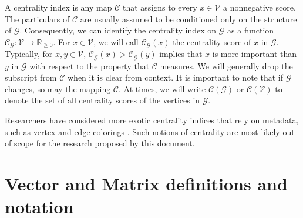 \documentclass{report}
\begin{document}
A centrality index is any map $\mathcal{C}$ that assigns to every $x \in \mathcal{V}$ a nonnegative score.
The particulars of $\mathcal{C}$ are usually assumed to be conditioned only on the structure of $\mathcal{G}$.
Consequently, we can identify the centrality index on $\mathcal{G}$ as a function $\mathcal{C}_\mathcal{G} : \mathcal{V} \rightarrow \mathbb{R}_{\geq 0}$.
For $x \in \mathcal{V}$, we will call $\mathcal{C}_\mathcal{G}(x)$ the centrality score of $x$ in $\mathcal{G}$. 
Typically, for $x,y \in \mathcal{V}$, $\mathcal{C}_\mathcal{G}(x) > \mathcal{C}_\mathcal{G}(y)$ implies that $x$ is more important than $y$ in $\mathcal{G}$ with respect to the property that $\mathcal{C}$ measures. 
We will generally drop the subscript from $\mathcal{C}$ when it is clear from context. 
It is important to note that if $\mathcal{G}$ changes, so may the mapping $\mathcal{C}$. 
At times, we will write $\mathcal{C}(\mathcal{G})$ or $\mathcal{C}(\mathcal{V})$ to denote the set of all centrality scores of the vertices in $\mathcal{G}$. 

Researchers have considered more exotic centrality indices that rely on metadata, such as vertex and edge colorings \cite{kang2016diffusion}.
Such notions of centrality are most likely out of scope for the research proposed by this document. 


\section{Vector and Matrix definitions and notation} \label{sec:matdef}
\end{document}
